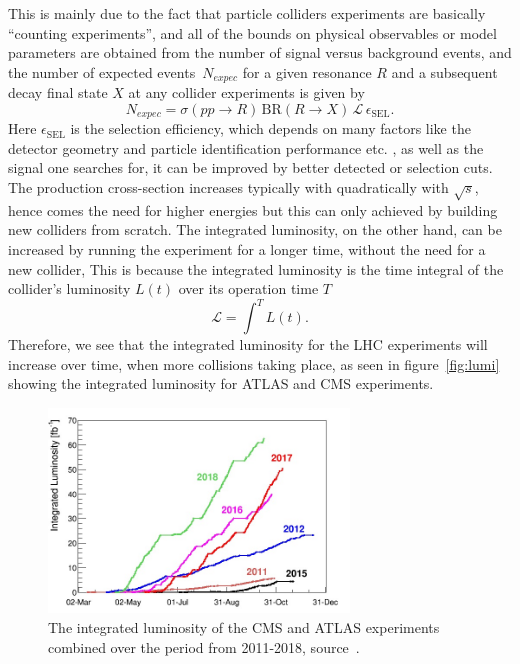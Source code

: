 This is mainly due to the fact that particle colliders experiments are basically ``counting experiments'', and all of the bounds on physical observables or model parameters are obtained from the number of signal versus background events, and the number of expected events~$N_{expec}$ for a given resonance $R$ and a subsequent decay final state $X$ at any collider experiments is given by
\begin{equation}
	N_{expec} = \sigma(pp\to R) \, \mathrm{BR}(R \to X)\,\mathscr{L}  \, \epsilon_{\mathrm{SEL}}.
	\label{nevents}
\end{equation}
Here $ \epsilon_{\mathrm{SEL}}$ is the selection efficiency, which depends on many factors like the detector geometry and particle identification performance etc. , as well as the signal one searches for, it can be improved by better detected or selection cuts. The production cross-section increases typically with quadratically with $\sqrt {s}$, hence comes the need for higher energies but this can only achieved by building new colliders from scratch. The integrated luminosity, on the other hand, can be increased by running the experiment for a longer time, without the need for a new collider,  This is because the integrated luminosity is the time integral of the collider's luminosity $L(t)$ over its operation time $T$
\begin{equation}
\mathscr{L} = \int^{T} L(t) .
\end{equation}
Therefore, we see that the integrated luminosity for the LHC experiments will increase over time, when more collisions taking place, as seen in figure~\autoref{fig:lumi} showing the integrated luminosity for ATLAS and CMS experiments. 
\begin{figure}[t!]
	\begin{center}
		\includegraphics[width=8cm]{figures/lhc_lumi}
		\caption{The integrated luminosity of the CMS and ATLAS experiments combined over the period from 2011-2018, source~\cite{lhcpreformance}.  \label{fig:lumi} }
	\end{center}
\end{figure}
